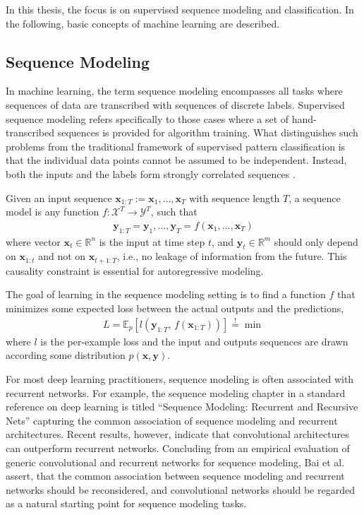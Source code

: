 \documentclass{scrartcl}
\begin{document}
In this thesis, the focus is on supervised sequence modeling and classification. In the following, basic concepts of machine learning are described. 

\subsection{Sequence Modeling}
In machine learning, the term sequence modeling encompasses all tasks where sequences of data are transcribed with sequences of discrete labels. Supervised sequence modeling refers specifically to those cases where a set of hand-transcribed sequences is provided for algorithm training. What distinguishes such problems from the traditional framework of supervised pattern classification is that the individual data points cannot be assumed to be independent. Instead, both the inputs and the labels form strongly correlated sequences \cite{Graves2012}.

Given an input sequence $\mathbf x_{1:T} := \mathbf x_1, \dots, \mathbf x_T$ with sequence length $T$, a sequence model is any function $f: \mathcal X^T \rightarrow \mathcal Y^T$, such that
\begin{align}
\mathbf y_{1:T} = \mathbf y_1, \dots, \mathbf y_T = f(\mathbf x_1,\dots, \mathbf x_T)
\end{align}
where vector $\mathbf x_t \in \mathbb R^n$ is the input at time step $t$, and $\mathbf y_t \in \mathbb R^m$ should only depend on $\mathbf x_{1:t}$ and not on $\mathbf x_{t+1:T}$, i.e., no leakage of information from the future. This causality constraint is essential for autoregressive modeling. 


The goal of learning in the sequence modeling setting is to find a function $f$ that minimizes some expected loss between the actual outputs and the predictions, 
\begin{align}
L = \mathbb E_p\left[l(\mathbf y_{1:T}, \, f(\mathbf x_{1:T}) )\right] \stackrel{\text{!}}{=} \min
\end{align}
where $l$ is the per-example loss and the input and outputs sequences are drawn according some distribution $p(\mathbf x,\mathbf y)$.

For most deep learning practitioners, sequence modeling is often associated with recurrent networks. For example, the sequence modeling chapter in a standard reference on deep learning is titled ``Sequence Modeling: Recurrent and Recursive Nets'' \cite{Goodfellow2016} capturing the common association of sequence modeling and recurrent architectures. Recent results, however, indicate that convolutional architectures can outperform recurrent networks. Concluding from an empirical evaluation of generic convolutional and recurrent networks for sequence modeling, Bai et al. \cite{Bai2018} assert, that the common association between sequence modeling and recurrent networks should be reconsidered, and convolutional networks should be regarded as a natural starting point for sequence modeling tasks.
\end{document}
